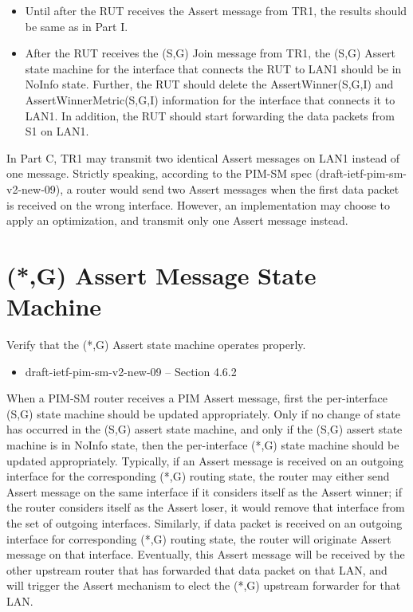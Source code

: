 \documentclass[11pt]{report}
\begin{document}

\begin{itemize}

  \item Until after the RUT receives the Assert message from TR1, the
  results should be same as in Part I.

  \item After the RUT receives the (S,G) Join message from TR1, the (S,G)
  Assert state machine for the interface that connects the RUT to LAN1 should
  be in NoInfo state.
  Further, the RUT should delete the AssertWinner(S,G,I) and
  AssertWinnerMetric(S,G,I) information for the interface that connects it to
  LAN1.
  In addition, the RUT should start forwarding the data packets from S1 on
  LAN1.

\end{itemize}

In Part C, TR1 may transmit two identical Assert messages on LAN1 instead of
one message. Strictly speaking, according to the PIM-SM spec
(draft-ietf-pim-sm-v2-new-09), a router would send two Assert messages
when the first data packet is received on the wrong interface.
However, an implementation may choose to apply an optimization, and
transmit only one Assert message instead.

\newpage
\section{(*,G) Assert Message State Machine}

Verify that the (*,G) Assert state machine operates properly.

\begin{itemize}
  \item draft-ietf-pim-sm-v2-new-09 -- Section 4.6.2
\end{itemize}

When a PIM-SM router receives a PIM Assert message, first the per-interface
(S,G) state machine should be updated appropriately. Only if no change of
state has occurred in the (S,G) assert state machine, and only if the (S,G)
assert state machine is in NoInfo state, then the per-interface
(*,G) state machine should be updated appropriately. Typically, if an
Assert message is received on an outgoing interface for the corresponding
(*,G) routing state, the router may either send Assert message on the
same interface if it considers itself as the Assert winner; if the router
considers itself as the Assert loser, it would remove that interface from the
set of outgoing interfaces. Similarly, if data packet is received on an
outgoing interface for corresponding (*,G) routing state, the router will
originate Assert message on that interface. Eventually, this Assert message
will be received by the other upstream router that has forwarded that data
packet on that LAN, and will trigger the Assert mechanism to elect the (*,G)
upstream forwarder for that LAN.
\end{document}
